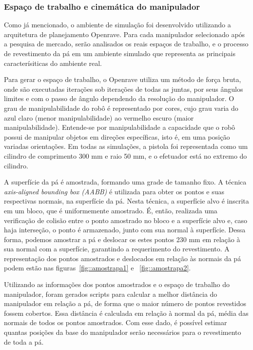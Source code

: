 \subsubsection{Espaço de trabalho e cinemática do manipulador}
Como já mencionado, o ambiente de simulação foi desenvolvido utilizando a
arquitetura de planejamento Openrave. Para cada manipulador selecionado após a
pesquisa de mercado, serão analisados os reais espaços de trabalho, e o processo de
revestimento da pá em um ambiente simulado que representa as principais
caracterísiticas do ambiente real.

Para gerar o espaço de trabalho, o Openrave utiliza um método de força bruta,
onde são executadas iterações sob iterações de todas as juntas, por seus ângulos
limites e com o passo de ângulo dependendo da resolução do manipulador. O grau
de manipulabilidade do robô é representado por cores, cujo grau varia do azul
claro (menor manipulabilidade) ao vermelho escuro (maior manipulabilidade).
Entende-se por manipulabilidade a capacidade que o robô possui de manipular
objetos em direções específicas, isto é, em uma posição variadas orientações. Em
todas as simulações, a pistola foi representada como um cilindro de comprimento
300 mm e raio 50 mm, e o efetuador está no extremo do cilindro.

A superfície da pá é amostrada, formando uma grade de tamanho fixo. A técnica
\textit{axis-aligned bounding box (AABB)} é utilizada para obter os
pontos e suas respectivas normais, na superfície da pá. Nesta técnica, a
superfície alvo é inscrita em um bloco, que é uniformemente amostrado. É, então,
realizada uma verificação de colisão entre o ponto amostrado no bloco e a
superfície alvo e, caso haja interseção, o ponto é armazenado, junto com sua
normal à superfície. Dessa forma, podemos amostrar a pá e deslocar os
estes pontos 230 mm em relação à sua normal com a superfície, garantindo a
requerimento do revestimento. A representação dos pontos amostrados e deslocados
em relação às normais da pá podem estão nas figuras~\ref{fig::amostrapa1} e
~\ref{fig::amostrapa2}. 

Utilizando as informações dos pontos amostrados e o espaço de trabalho do
manipulador, foram gerados scripts para calcular a
melhor distância do manipulador em relação a pá, de forma que o maior número de
pontos revestidos fossem cobertos. Essa distância é calculada em relação à normal da pá, média das normais
de todos os pontos amostrados. Com esse dado, é possível estimar quantas
posições da base do manipulador serão necessários para o revestimento de toda a
pá.

